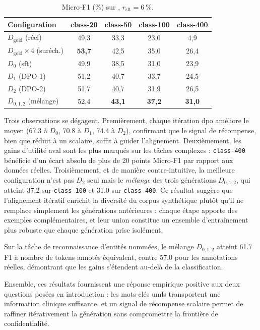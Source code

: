 \begin{table}[htbp]
\centering
\small
\begin{tabular}{lcccc}
\toprule
Configuration & class-20 & class-50 & class-100 & class-400 \\
\midrule
$D_{\text{gold}}$ (réel)               & 49,3 & 33,3 & 23,0 &  4,9 \\
$D_{\text{gold}} \times 4$ (suréch.)   & \textbf{53,7} & 42,5 & 35,0 & 26,4 \\
$D_0$ (\gls{sft})                            & 49,9 & 38,5 & 31,0 & 23,9 \\
$D_1$ (DPO-1)                          & 51,2 & 40,7 & 33,7 & 24,5 \\
$D_2$ (DPO-2)                          & 51,7 & 40,7 & 31,9 & 26,5 \\
$D_{0,1,2}$ (mélange)                  & 52,4 & \textbf{43,1} & \textbf{37,2} & \textbf{31,0} \\
\bottomrule
\end{tabular}
\caption{Micro-F1 (\%) sur \mimic, $r_{\text{sft}} = \SI{6}{\percent}$.}
\label{tab:mimic-micro-f1}
\end{table}

Trois observations se dégagent.
Premièrement, chaque itération \gls{dpo} améliore le \score{} moyen (\num{67.3} à $D_0$, \num{70.8} à $D_1$, \num{74.4} à $D_2$), confirmant que le signal de récompense, bien que réduit à un scalaire, suffit à guider l'alignement.
Deuxièmement, les gains d'utilité aval sont les plus marqués sur les tâches complexes : \texttt{class-400} bénéficie d'un écart absolu de plus de \num{20} points Micro-F1 par rapport aux données réelles.
Troisièmement, et de manière contre-intuitive, la meilleure configuration n'est pas $D_2$ seul mais le \emph{mélange} des trois générations $D_{0,1,2}$, qui atteint \num{37.2} sur \texttt{class-100} et \num{31.0} sur \texttt{class-400}.
Ce résultat suggère que l'alignement itératif enrichit la diversité du corpus synthétique plutôt qu'il ne remplace simplement les générations antérieures : chaque étape apporte des exemples complémentaires, et leur union constitue un ensemble d'entraînement plus robuste que chaque génération prise isolément.

Sur la tâche de reconnaissance d'entités nommées, le mélange $D_{0,1,2}$ atteint \num{61.7} F1 à nombre de tokens annotés équivalent, contre \num{57.0} pour les annotations réelles, démontrant que les gains s'étendent au-delà de la classification.

Ensemble, ces résultats fournissent une réponse empirique positive aux deux questions posées en introduction : les mots-clés \gls{umls} transportent une information clinique suffisante, et un signal de récompense scalaire permet de raffiner itérativement la génération sans compromettre la frontière de confidentialité.

